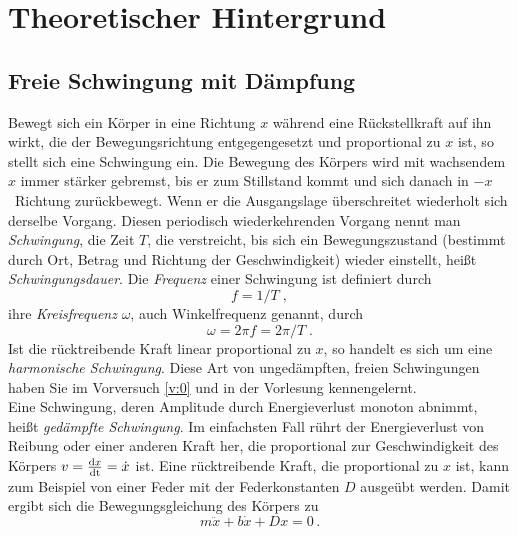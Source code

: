 \section{Theoretischer Hintergrund}

\subsection{Freie Schwingung mit Dämpfung}

Bewegt sich ein Körper in eine Richtung $x$ während eine Rückstellkraft auf ihn wirkt, die der Bewegungsrichtung entgegengesetzt und proportional zu $x$ ist, so stellt sich eine Schwingung ein. Die Bewegung des  Körpers wird mit wachsendem $x$ immer stärker gebremst, bis er zum Stillstand kommt und sich danach in $-x$~Richtung zurückbewegt. Wenn er die Ausgangslage überschreitet wiederholt sich derselbe Vorgang. Diesen periodisch wiederkehrenden Vorgang nennt man \textit{Schwingung}, die Zeit $T$, die verstreicht, bis sich ein Bewegungszustand (bestimmt durch Ort, Betrag und Richtung der Geschwindigkeit) wieder einstellt, heißt \textit{Schwingungsdauer}. Die \textit{Frequenz} einer Schwingung ist definiert durch
\begin{equation}
f = 1/T \; ,
\end{equation}
ihre \textit{Kreisfrequenz} $\omega$, auch Winkelfrequenz genannt, durch
\begin{equation}
\omega = 2\pi f = 2\pi /T\; .
\end{equation}
%
Ist die rücktreibende Kraft linear proportional zu $x$, so handelt es sich um eine \textit{harmonische Schwingung}. Diese Art von ungedämpften, freien Schwingungen haben Sie im Vorversuch \ref{v:0} und in der Vorlesung kennengelernt.\\
Eine Schwingung, deren Amplitude durch Energieverlust monoton abnimmt, heißt \textit{gedämpfte Schwingung}. Im einfachsten Fall rührt der Energieverlust von Reibung oder einer anderen Kraft her, die proportional zur Geschwindigkeit des Körpers $v = \frac{{\rm d} x}{\rm dt} = \dot{x}$ ist. Eine rücktreibende Kraft, die proportional zu $x$ ist, kann zum Beispiel von einer Feder mit der Federkonstanten $D$ ausgeübt werden. Damit ergibt sich die Bewegungsgleichung des Körpers zu
\begin{equation}
	m\ddot{x} + b\dot{x} + Dx = 0 \, .
\label{eq:Schwingungsgleichung_vn1}
\end{equation}

